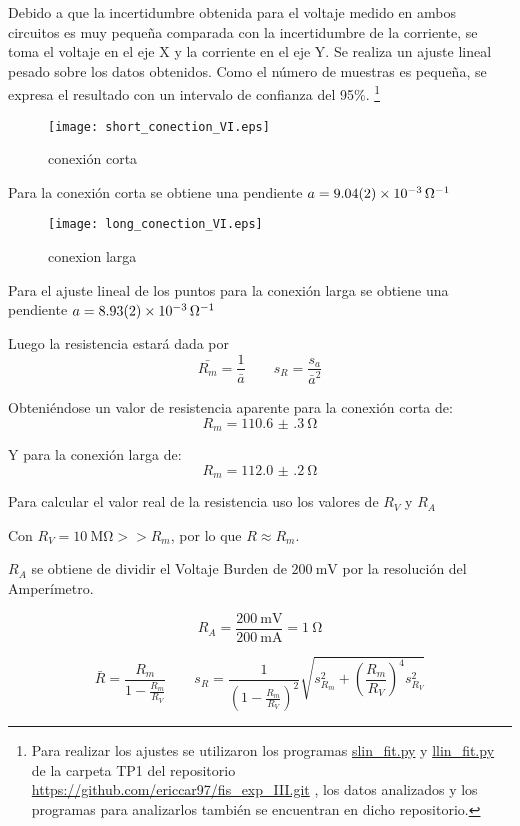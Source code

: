 \documentclass[12pt,a4paper]{article}
\begin{document}
Debido a que la incertidumbre obtenida para el voltaje medido en ambos circuitos es muy pequeña comparada con la incertidumbre de la corriente, se toma el voltaje en el eje X y la corriente en el eje Y. Se realiza un ajuste lineal pesado sobre los datos obtenidos. Como el n\'umero de muestras es pequeña, se expresa el resultado con un  intervalo de confianza del 95\%. \footnote{Para realizar los ajustes se utilizaron los programas \url{slin_fit.py} y \url{llin_fit.py} de la carpeta TP1 del repositorio \url{https://github.com/ericcar97/fis_exp_III.git} , los datos analizados y los programas para analizarlos también se encuentran en dicho repositorio.}

\begin{figure}[H]
  \centering
   \texttt{[image: short\_conection\_VI.eps]}
\caption{conexión corta}
  \label{fig:ejemplo}
\end{figure}

Para la conexión corta se obtiene una pendiente $ a = \SI{9.04(2)d-3}{\ohm^{-1}} $


\begin{figure}[H]
  \centering
   \texttt{[image: long\_conection\_VI.eps]}
\caption{conexion larga}
  \label{fig:ejemplo}
\end{figure}


Para el ajuste lineal de los puntos para la conexión larga se obtiene una pendiente $ a = \SI{8.93(2)d-3}{\ohm^{-1}} $


Luego la resistencia estará dada por $$ \bar{R_m} = \frac{1}{\bar{a}} \qquad s_R = \frac{s_a}{\bar{a}^2}$$

Obteniéndose un valor de resistencia aparente para la conexión corta de: $$R_m = \SI{110.6(3)}{\ohm}$$ 

Y para la conexión larga de: $$R_m = \SI{112.0(2)}{\ohm}$$ 

Para calcular el valor real de la resistencia uso los valores de $R_V$ y $R_A$

Con $ R_V = \SI{10}{\mega\ohm} >> R_m$, por lo que $R \approx R_m$.

$R_A$ se obtiene de dividir el Voltaje Burden de $\SI{200}{\milli\volt}$ por la resolución del Amperímetro.

$$R_A = \frac{\SI{200}{\milli\volt}}{\SI{200}{\milli\ampere}} = \SI{1}{\ohm}$$

$$\bar{R} = \frac{R_m}{1-\frac{R_m}{R_V}} \qquad s_R = \frac{1}{\left(1-\frac{R_m}{R_V}\right)^2} \sqrt{s_{R_m}^2+\left(\frac{R_m}{R_V}\right)^4 s_{R_V}^2}$$
\end{document}
